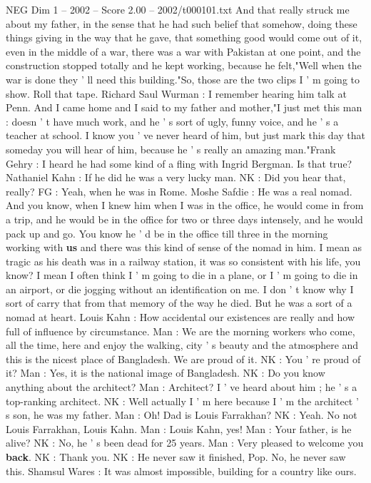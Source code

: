 \begin{textsample}{NEG Dim 1 – 2002 – Score 2.00 – 2002/t000101.txt}
And that really struck me about my father, in the sense that he had such belief that somehow, doing these things giving in the way that he gave, that something good would come out of it, even in the middle of a war, there was a war with Pakistan at one point, and the construction stopped totally and he kept working, because he felt,"Well when the war is done they ' ll need this building."So, those are the two clips I ' m going to show.
Roll that tape.
Richard Saul Wurman : I remember hearing him talk at Penn.
And I came home and I said to my father and mother,"I just met this man : doesn ' t have much work, and he ' s sort of ugly, funny voice, and he ' s a teacher at school.
I know you ' ve never heard of him, but just mark this day that someday you will hear of him, because he ' s really an amazing man."Frank Gehry : I heard he had some kind of a fling with Ingrid Bergman.
Is that true?
Nathaniel Kahn : If he did he was a very lucky man.
NK : Did you hear that, really?
FG : Yeah, when he was in Rome.
Moshe Safdie : He was a real nomad.
And you know, when I knew him when I was in the office, he would come in from a trip, and he would be in the office for two or three days intensely, and he would pack up and go.
You know he ' d be in the office till three in the morning working with \textbf{us} and there was this kind of sense of the nomad in him.
I mean as tragic as his death was in a railway station, it was so consistent with his life, you know?
I mean I often think I ' m going to die in a plane, or I ' m going to die in an airport, or die jogging without an identification on me.
I don ' t know why I sort of carry that from that memory of the way he died.
But he was a sort of a nomad at heart.
Louis Kahn : How accidental our existences are really and how full of influence by circumstance.
Man : We are the morning workers who come, all the time, here and enjoy the walking, city ' s beauty and the atmosphere and this is the nicest place of Bangladesh.
We are proud of it.
NK : You ' re proud of it?
Man : Yes, it is the national image of Bangladesh.
NK : Do you know anything about the architect?
Man : Architect?
I ' ve heard about him ; he ' s a top-ranking architect.
NK : Well actually I ' m here because I ' m the architect ' s son, he was my father.
Man : Oh!
Dad is Louis Farrakhan?
NK : Yeah.
No not Louis Farrakhan, Louis Kahn.
Man : Louis Kahn, yes!
Man : Your father, is he alive?
NK : No, he ' s been dead for 25 years.
Man : Very pleased to welcome you \textbf{back}.
NK : Thank you.
NK : He never saw it finished, Pop.
No, he never saw this.
Shamsul Wares : It was almost impossible, building for a country like ours.

\end{textsample}
